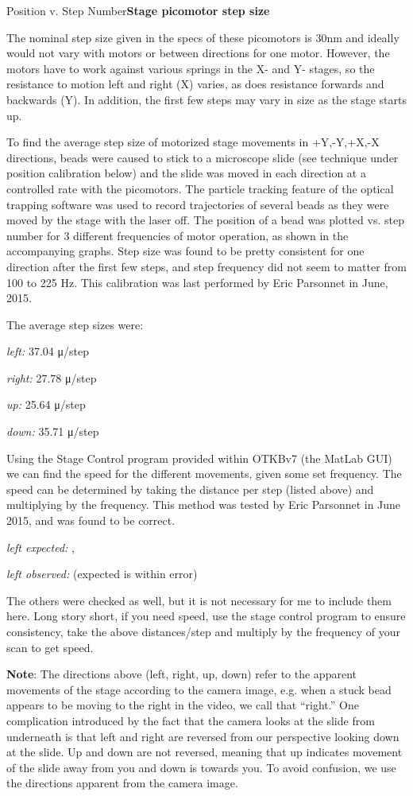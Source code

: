 \documentclass{../lab}
\begin{document}
Position v. Step Number\textbf{Stage picomotor step size}

The nominal step size given in the specs of these picomotors is 30nm and ideally would not vary with motors or between directions for one motor. However, the motors have to work against various springs in the X- and Y- stages, so the resistance to motion left and right (X) varies, as does resistance forwards and backwards (Y). In addition, the first few steps may vary in size as the stage starts up.

To find the average step size of motorized stage movements in +Y,-Y,+X,-X directions, beads were caused to stick to a microscope slide (see technique under position calibration below) and the slide was moved in each direction at a controlled rate with the picomotors. The particle tracking feature of the optical trapping software was used to record trajectories of several beads as they were moved by the stage with the laser off. The position of a bead was plotted vs. step number for 3 different frequencies of motor operation, as shown in the accompanying graphs. Step size was found to be pretty consistent for one direction after the first few steps, and step frequency did not seem to matter from 100 to 225 Hz. This calibration was last performed by Eric Parsonnet in June, 2015.

The average step sizes were:

\emph{left:} 37.04 μ/step

\emph{right:} 27.78 μ/step

\emph{up:} 25.64 μ/step

\emph{down:} 35.71 μ/step

Using the Stage Control program provided within OTKBv7 (the MatLab GUI) we can find the speed for the different movements, given some set frequency. The speed can be determined by taking the distance per step (listed above) and multiplying by the frequency. This method was tested by Eric Parsonnet in June 2015, and was found to be correct.

\emph{left expected:} ,

\emph{left observed:}  (expected is within error)

The others were checked as well, but it is not necessary for me to include them here. Long story short, if you need speed, use the stage control program to ensure consistency, take the above distances/step and multiply by the frequency of your scan to get speed.

\textbf{Note}: The directions above (left, right, up, down) refer to the apparent movements of the stage according to the camera image, e.g. when a stuck bead appears to be moving to the right in the video, we call that ``right.'' One complication introduced by the fact that the camera looks at the slide from underneath is that left and right are reversed from our perspective looking down at the slide. Up and down are not reversed, meaning that up indicates movement of the slide away from you and down is towards you. To avoid confusion, we use the directions apparent from the camera image.
\end{document}
